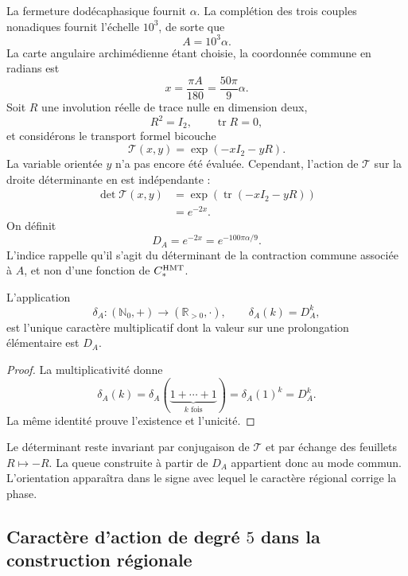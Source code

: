
La fermeture dodécaphasique fournit \(\alpha\). La complétion des trois
couples nonadiques fournit l'échelle \(10^3\), de sorte que
\[
A=10^3\alpha.
\]
La carte angulaire archimédienne étant choisie, la coordonnée commune en radians est
\[
x=\frac{\pi A}{180}=\frac{50\pi}{9}\alpha.
\]
Soit \(R\) une involution réelle de trace nulle en dimension deux,
\[
R^2=I_2,
\qquad
\operatorname{tr}R=0,
\]
et considérons le transport formel bicouche
\[
\mathcal T(x,y)=\exp(-xI_2-yR).
\]
La variable orientée \(y\) n'a pas encore été évaluée. Cependant, l'action
de \(\mathcal T\) sur la droite déterminante en est indépendante :
\[
\begin{aligned}
\det\mathcal T(x,y)
&=\exp\!\left(\operatorname{tr}(-xI_2-yR)\right)\\
&=e^{-2x}.
\end{aligned}
\]
On définit
\[
\boxed{
D_A=e^{-2x}=e^{-100\pi\alpha/9}.}
\]
L'indice rappelle qu'il s'agit du déterminant de la contraction commune associée à \(A\), et non d'une fonction de \(C_*^{\rm HMT}\).

\begin{proposition}
\label{p3-83-c30-s1:prop:caracter-determinante}
L'application
\[
\delta_A:(\mathbb N_0,+)\longrightarrow(\mathbb R_{>0},\cdot),
\qquad
\delta_A(k)=D_A^k,
\]
est l'unique caractère multiplicatif dont la valeur sur une prolongation
élémentaire est \(D_A\).
\end{proposition}

\begin{proof}
La multiplicativité donne
\[
\delta_A(k)
=\delta_A(\underbrace{1+\cdots+1}_{k\text{ fois}})
=\delta_A(1)^k=D_A^k.
\]
La même identité prouve l'existence et l'unicité.
\end{proof}

Le déterminant reste invariant par conjugaison de \(\mathcal T\) et par échange des feuillets \(R\mapsto-R\). La queue construite à partir de \(D_A\) appartient donc au mode commun. L'orientation apparaîtra dans le signe avec lequel le caractère régional corrige la phase.

\subsection{Caractère d'action de degré \texorpdfstring{\(5\)}{5} dans la construction régionale}
\label{sec:s102:c38:3:2}

